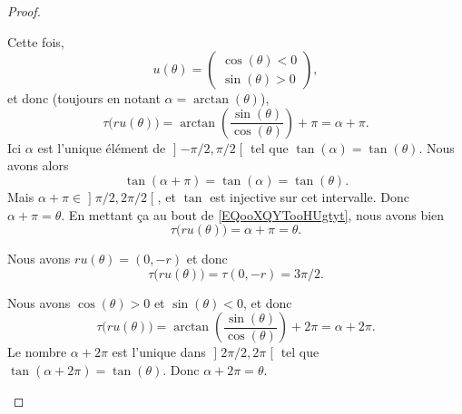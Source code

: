 \begin{proof}
\begin{subproof}
			Cette fois,
			\begin{equation}
				u(\theta)=\begin{pmatrix}
					\cos(\theta)<0 \\
					\sin(\theta)>0
				\end{pmatrix},
			\end{equation}
			et donc (toujours en notant \( \alpha=\arctan(\theta)\)),
			\begin{equation}		\label{EQooXQYTooHUgtyt}
				\tau\big( ru(\theta) \big)=\arctan\left( \frac{ \sin(\theta) }{ \cos(\theta) } \right)+\pi=\alpha+\pi.
			\end{equation}
			Ici \( \alpha\) est l'unique élément de \( \mathopen] -\pi/2,\pi/2\mathclose[\) tel que \( \tan(\alpha)=\tan(\theta)\). Nous avons alors
			\begin{equation}
				\tan(\alpha+\pi)=\tan(\alpha)=\tan(\theta).
			\end{equation}
			Mais \( \alpha+\pi\in\mathopen] \pi/2,2\pi/2\mathclose[\), et \( \tan \) est injective sur cet intervalle. Donc \( \alpha+\pi=\theta\). En mettant ça au bout de \eqref{EQooXQYTooHUgtyt}, nous avons bien
			\begin{equation}
				\tau\big( ru(\theta) \big)=\alpha+\pi=\theta.
			\end{equation}

			\spitem[Si \( \theta=2\pi/2\)]
			Nous avons \( ru(\theta)=(0,-r)\) et donc
			\begin{equation}
				\tau\big( ru(\theta) \big)=\tau(0,-r)=3\pi/2.
			\end{equation}

			Nous avons \( \cos(\theta)>0\) et \( \sin(\theta)<0\), et donc
			\begin{equation}
				\tau\big( ru(\theta) \big)=\arctan\left( \frac{ \sin(\theta) }{ \cos(\theta) } \right)+2\pi=\alpha+2\pi.
			\end{equation}
			Le nombre \( \alpha+2\pi\) est l'unique dans \( \mathopen] 2\pi/2,2\pi\mathclose[\) tel que \( \tan(\alpha+2\pi)=\tan(\theta)\). Donc \( \alpha+2\pi=\theta\).
	\end{subproof}
\end{proof}



